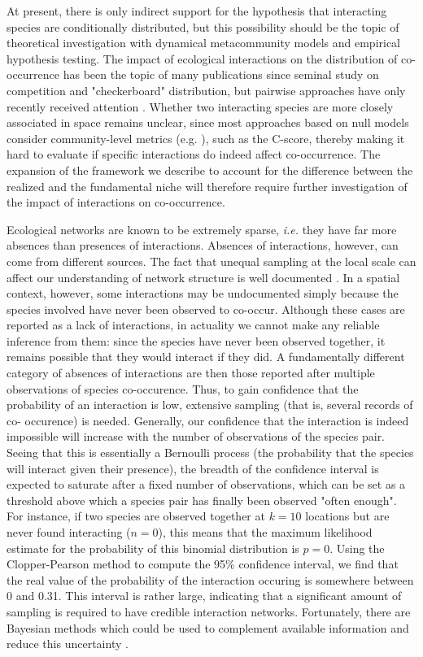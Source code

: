 \documentclass[12pt]{article}
\begin{document}
At present, there is only indirect support for the hypothesis that interacting
species are conditionally distributed, but this possibility should be the
topic of theoretical investigation with dynamical metacommunity models
\citep{Cazelles2015} and empirical hypothesis testing. The impact of
ecological interactions on the distribution of co-occurrence has been the
topic of many publications since \citet{Diamond1975} seminal study on
competition and "checkerboard" distribution, but pairwise approaches have only
recently received attention \citep{Veech2013}. Whether two interacting species
are more closely associated in space remains unclear, since most approaches
based on null models consider community-level metrics (e.g.
\citealt{Gotelli2000}), such as the C-score, thereby making it hard to
evaluate if specific interactions do indeed affect co-occurrence. The
expansion of the framework we describe to account for the difference between
the realized and the fundamental niche will therefore require further
investigation of the impact of interactions on co-occurrence.

Ecological networks are known to be extremely sparse, \emph{i.e.} they have
far more absences than presences of interactions. Absences of interactions,
however, can come from different sources. The fact that unequal sampling at
the local scale can affect our understanding of network structure is well
documented \citep{Martinez1999}. In a spatial context, however, some
interactions may be undocumented simply because the species involved have
never been observed to co-occur. Although these cases are reported as a lack
of interactions, in actuality we cannot make any reliable inference from them:
since the species have never been observed together, it remains possible that
they would interact if they did. A fundamentally different category of
absences of interactions are then those reported after multiple observations
of species co-occurence. Thus, to gain confidence that the probability of an
interaction is low, extensive sampling (that is, several records of co-
occurence) is needed. Generally, our confidence that the interaction is indeed
impossible will increase with the number of observations of the species pair.
Seeing that this is essentially a Bernoulli process (the probability that the
species will interact given their presence), the breadth of the confidence
interval is expected to saturate after a fixed number of observations, which
can be set as a threshold above which a species pair has finally been observed
"often enough". For instance, if two species are observed together at $k=10$
locations but are never found interacting ($n=0$), this means that the maximum
likelihood estimate for the probability of this binomial distribution is
$p=0$. Using the Clopper-Pearson method to compute the 95\% confidence
interval, we find that the real value of the probability of the interaction
occuring is somewhere between 0 and 0.31. This interval is rather large,
indicating that a significant amount of sampling is required to have credible
interaction networks. Fortunately, there are Bayesian methods which could be
used to complement available information and reduce this uncertainty
\citep{Cirtwill2018}.
\end{document}
